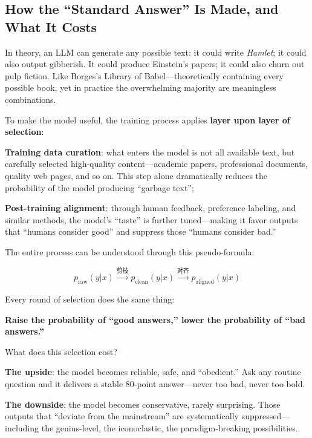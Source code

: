 \subsection{How the ``Standard Answer'' Is Made, and What It Costs}

In theory, an LLM can generate any possible text: it could write \textit{Hamlet}; it could also output gibberish. It could produce Einstein's papers; it could also churn out pulp fiction. Like Borges's Library of Babel---theoretically containing every possible book, yet in practice the overwhelming majority are meaningless combinations.

To make the model useful, the training process applies \textbf{layer upon layer of selection}:

\textbf{Training data curation}: what enters the model is not all available text, but carefully selected high-quality content---academic papers, professional documents, quality web pages, and so on. This step alone dramatically reduces the probability of the model producing ``garbage text'';

\textbf{Post-training alignment}: through human feedback, preference labeling, and similar methods, the model's ``taste'' is further tuned---making it favor outputs that ``humans consider good'' and suppress those ``humans consider bad.''

The entire process can be understood through this pseudo-formula:

\begin{equation*}
p_{\text{raw}}(y|x) \xrightarrow{\text{剪枝}} p_{\text{clean}}(y|x) \xrightarrow{\text{对齐}} p_{\text{aligned}}(y|x)
\end{equation*}

Every round of selection does the same thing:

\textbf{Raise the probability of ``good answers,'' lower the probability of ``bad answers.''}

\vspace{1em}

What does this selection cost?

\textbf{The upside}: the model becomes reliable, safe, and ``obedient.'' Ask any routine question and it delivers a stable 80-point answer---never too bad, never too bold.

\textbf{The downside}: the model becomes conservative, rarely surprising. Those outputs that ``deviate from the mainstream'' are systematically suppressed---including the genius-level, the iconoclastic, the paradigm-breaking possibilities.

